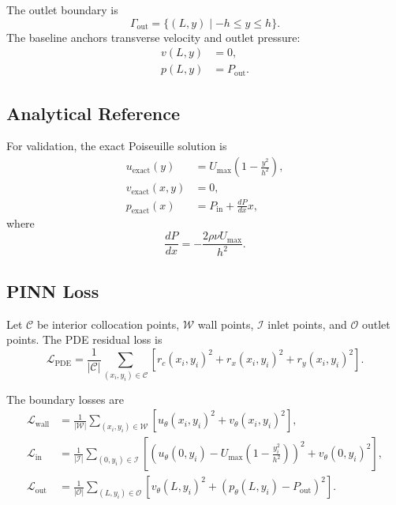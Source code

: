\documentclass[11pt]{article}
\begin{document}
The outlet boundary is
\begin{equation}
    \Gamma_{\mathrm{out}}
    =
    \{(L,y)\mid -h\le y\le h\}.
\end{equation}
The baseline anchors transverse velocity and outlet pressure:
\begin{align}
    v(L,y)&=0,\\
    p(L,y)&=P_{\mathrm{out}}.
\end{align}

\subsection{Analytical Reference}

For validation, the exact Poiseuille solution is
\begin{align}
    u_{\mathrm{exact}}(y)
    &=
    U_{\max}
    \left(
        1-\frac{y^2}{h^2}
    \right),\\
    v_{\mathrm{exact}}(x,y)
    &=0,\\
    p_{\mathrm{exact}}(x)
    &=
    P_{\mathrm{in}}
    +
    \frac{dP}{dx}x,
\end{align}
where
\begin{equation}
    \frac{dP}{dx}
    =
    -\frac{2\rho\nu U_{\max}}{h^2}.
\end{equation}

\subsection{PINN Loss}

Let $\mathcal{C}$ be interior collocation points, $\mathcal{W}$ wall points, $\mathcal{I}$ inlet points, and $\mathcal{O}$ outlet points. The PDE residual loss is
\begin{equation}
    \mathcal{L}_{\mathrm{PDE}}
    =
    \frac{1}{|\mathcal{C}|}
    \sum_{(x_i,y_i)\in\mathcal{C}}
    \left[
        r_c(x_i,y_i)^2
        +
        r_x(x_i,y_i)^2
        +
        r_y(x_i,y_i)^2
    \right].
\end{equation}

The boundary losses are
\begin{align}
    \mathcal{L}_{\mathrm{wall}}
    &=
    \frac{1}{|\mathcal{W}|}
    \sum_{(x_i,y_i)\in\mathcal{W}}
    \left[
        u_{\theta}(x_i,y_i)^2
        +
        v_{\theta}(x_i,y_i)^2
    \right],\\
    \mathcal{L}_{\mathrm{in}}
    &=
    \frac{1}{|\mathcal{I}|}
    \sum_{(0,y_i)\in\mathcal{I}}
    \left[
        \left(
            u_{\theta}(0,y_i)
            -
            U_{\max}
            \left(
                1-\frac{y_i^2}{h^2}
            \right)
        \right)^2
        +
        v_{\theta}(0,y_i)^2
    \right],\\
    \mathcal{L}_{\mathrm{out}}
    &=
    \frac{1}{|\mathcal{O}|}
    \sum_{(L,y_i)\in\mathcal{O}}
    \left[
        v_{\theta}(L,y_i)^2
        +
        \left(
            p_{\theta}(L,y_i)-P_{\mathrm{out}}
        \right)^2
    \right].
\end{align}
\end{document}
